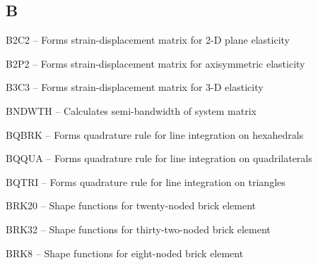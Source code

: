 \subsection*{B} %
\begin{list}{}{\leftmargin=80pt  \itemsep=0pt}
\item[B2C2 \hfill]   -- Forms strain-displacement matrix for 2-D plane elasticity
\item[B2P2 \hfill]   -- Forms strain-displacement matrix for axisymmetric elasticity
\item[B3C3 \hfill]   -- Forms strain-displacement matrix for 3-D elasticity
\item[BNDWTH \hfill] -- Calculates semi-bandwidth of system matrix
\item[BQBRK \hfill]  -- Forms quadrature rule for line integration on hexahedrals
\item[BQQUA \hfill]  -- Forms quadrature rule for line integration on quadrilaterals
\item[BQTRI \hfill]  -- Forms quadrature rule for line integration on triangles
\item[BRK20 \hfill]  -- Shape functions for twenty-noded brick element
\item[BRK32 \hfill]  -- Shape functions for thirty-two-noded brick element
\item[BRK8 \hfill]   -- Shape functions for eight-noded brick element
\end{list}
